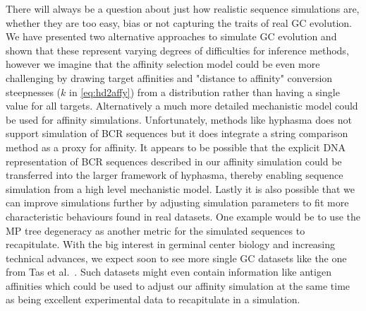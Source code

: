 There will always be a question about just how realistic sequence simulations are, whether they are too easy, bias or not capturing the traits of real GC evolution.
We have presented two alternative approaches to simulate GC evolution and shown that these represent varying degrees of difficulties for inference methods, however we imagine that the affinity selection model could be even more challenging by drawing target affinities and "distance to affinity" conversion steepnesses ($k$ in \eqref{eq:hd2affy}) from a distribution rather than having a single value for all targets.
Alternatively a much more detailed mechanistic model could be used for affinity simulations.
Unfortunately, methods like hyphasma \cite{robert2017simulate} does not support simulation of BCR sequences but it does integrate a string comparison method as a proxy for affinity.
It appears to be possible that the explicit DNA representation of BCR sequences described in our affinity simulation could be transferred into the larger framework of hyphasma, thereby enabling sequence simulation from a high level mechanistic model.
Lastly it is also possible that we can improve simulations further by adjusting simulation parameters to fit more characteristic behaviours found in real datasets.
One example would be to use the MP tree degeneracy as another metric for the simulated sequences to recapitulate.
With the big interest in germinal center biology and increasing technical advances, we expect soon to see more single GC datasets like the one from Tas et al.\ \cite{tas2016visualizing}.
Such datasets might even contain information like antigen affinities which could be used to adjust our affinity simulation at the same time as being excellent experimental data to recapitulate in a simulation.


